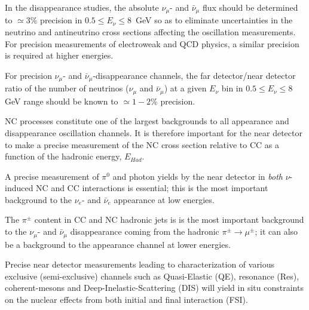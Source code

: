 In the disappearance 
studies, the absolute $\nu_\mu$- and $\bar \nu_\mu$ flux should be determined to $\simeq 3\%$ precision in 
$0.5 \leq E_\nu \leq 8$~GeV so as to eliminate uncertainties in the neutrino 
and antineutrino cross sections affecting the oscillation measurements. For precision measurements of electroweak 
and QCD physics, a similar precision is required at higher energies. 


 
For precision $\nu_\mu$- and $\bar \nu_\mu$-disappearance  
channels, the far detector/near detector ratio of the number of neutrinos ($\nu_\mu$  and $\bar \nu_\mu$)
at a given $E_\nu$ bin in $0.5 \leq E_\nu \leq 8$ GeV range should be known
to $\simeq 1-2\%$ precision. 


NC processes 
constitute one of the largest backgrounds to all appearance and disappearance oscillation 
channels. It is therefore important for the near detector to make a precise measurement of the NC cross section relative to 
CC as a function of the hadronic energy, $E_{Had}$. 


A precise measurement of $\pi^0$ and photon yields by the near detector in \textit{both}  $\nu$-induced NC and CC interactions is
essential;
this is the most important background to the $\nu_e$- and $\bar \nu_e$ appearance at low energies.



The $\pi^{\pm}$ content in CC and NC hadronic jets is is the most important background to 
the $\nu_\mu$- and $\bar \nu_\mu$ disappearance coming from the hadronic   $\pi^{\pm} \rightarrow \mu^{\pm}$; 
it can also be a background to the appearance channel at lower energies. 


Precise near detector measurements leading to characterization of 
 various exclusive (semi-exclusive) 
channels such as Quasi-Elastic (QE), resonance (Res), 
coherent-mesons and Deep-Inelastic-Scattering (DIS)
will yield  
 in situ constraints on the nuclear effects from both initial and final interaction (FSI). 

